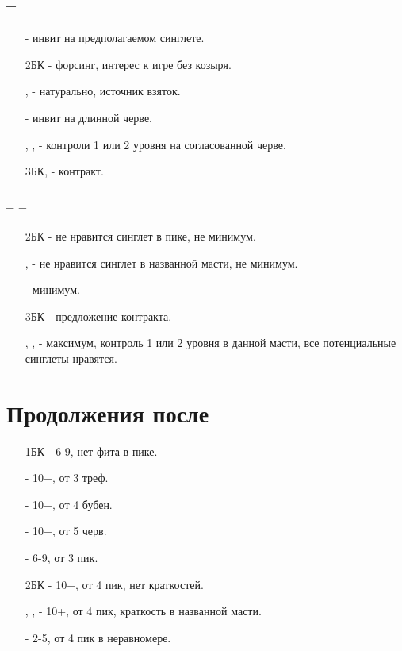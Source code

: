 \documentclass{article}
\begin{document}
\subsection{ -- }
\begin{enumerate} 
    \item[\sp{2}] - инвит на предполагаемом синглете.
    \item[2БК] - форсинг, интерес к игре без козыря.
    \item[\cl{3}, \di{3}] - натурально, источник взяток.
    \item[\he{3}] - инвит на длинной черве.
    \item[\sp{3}, \cl{4}, \di{4}] - контроли 1 или 2 уровня на согласованной черве.
    \item[3БК, \he{4}] - контракт.
\end{enumerate}
\subsubsection{ --  -- }
\begin{enumerate}
    \item[2БК] - не нравится синглет в пике, не минимум.
    \item[\cl{3}, \di{3}] -  не нравится синглет в названной масти, не минимум.
    \item[\he{3}] - минимум.
    \item[3БК] - предложение контракта.
    \item[\sp{3}, \cl{4}, \di{4}] - максимум, контроль 1 или 2 уровня в данной масти, все потенциальные синглеты нравятся.
\end{enumerate}
\section{Продолжения после }
\begin{enumerate}
    \item[1БК] - 6-9, нет фита в пике.
    \item[\cl{2}] - 10+, от 3 треф.
    \item[\di{2}] - 10+, от 4 бубен.
    \item[\he{2}] - 10+, от 5 черв.
    \item[\sp{2}] - 6-9, от 3 пик.
    \item[2БК] - 10+, от 4 пик, нет краткостей.
    \item[\cl{3}, \di{3}, \he{3}] - 10+, от 4 пик, краткость в названной масти.
    \item[\sp{3}] - 2-5, от 4 пик в неравномере.
\end{enumerate}
\end{document}
